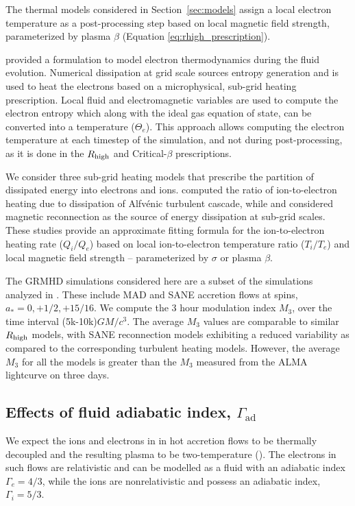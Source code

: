 The thermal models considered in Section~\ref{sec:models} assign a local electron temperature as a post-processing step based on local magnetic field strength, parameterized by plasma $\beta$ (Equation \ref{eq:rhigh_prescription}).

\citealt{10.1093/mnras/stv2084} provided a formulation to model electron thermodynamics during the fluid evolution. Numerical dissipation at grid scale sources entropy generation and is used to heat the electrons based on a microphysical, sub-grid heating prescription. Local fluid and electromagnetic variables are used to compute the electron entropy which along with the ideal gas equation of state, can be converted into a temperature ($\Theta_{e}$). This approach allows computing the electron temperature at each timestep of the simulation, and not during post-processing, as it is done in the $R_\mathrm{high}$ and Critical-$\beta$ prescriptions.

We consider three sub-grid heating models that prescribe the partition of dissipated energy into electrons and ions. \citealt{2010MNRAS.409L.104H} computed the ratio of ion-to-electron heating due to dissipation of Alfv\'enic turbulent cascade, while \citealt{10.1093/mnras/stx2530} and \citealt{Rowan_2017} considered magnetic reconnection as the source of energy dissipation at sub-grid scales. These studies provide an approximate fitting formula for the ion-to-electron heating rate ($Q_{i}/Q_{e}$) based on local ion-to-electron temperature ratio ($T_{i}/T_{e}$) and local magnetic field strength -- parameterized by $\sigma$ or plasma $\beta$.

The GRMHD simulations considered here are a subset of the simulations analyzed in \citealt{2020MNRAS.494.4168D}. These include MAD and SANE accretion flows at spins, $a_{*}=0,+1/2,+15/16$. We compute the 3 hour modulation index $M_{3}$, over the time interval (5k-10k)$GM/c^{3}$. The average $M_{3}$ values are comparable to similar $R_\mathrm{high}$ models, with SANE reconnection models exhibiting a reduced variability as compared to the corresponding turbulent heating models. However, the average $M_{3}$ for all the models is greater than the $M_{3}$ measured from the ALMA lightcurve on three days.

\subsection{Effects of fluid adiabatic index, $\Gamma_\mathrm{ad}$}

We expect the ions and electrons in in hot accretion flows to be thermally decoupled and the resulting plasma to be two-temperature (\citealt{1976ApJ...204..187S, Quataert_1998, 10.1093/mnras/stw3116, Ryan_2018}). The electrons in such flows are relativistic and can be modelled as a fluid with an adiabatic index $\Gamma_{e}=4/3$, while the ions are nonrelativistic and possess an adiabatic index, $\Gamma_{i}=5/3$.

